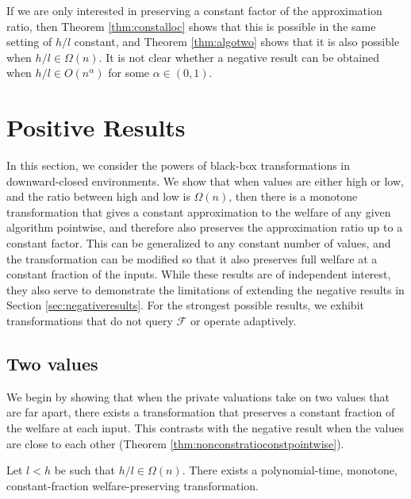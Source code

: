 \documentclass[runningheads,a4paper]{llncs}
\begin{document}
If we are only interested in preserving a constant factor of the approximation ratio, then Theorem \ref{thm:constalloc} shows that this is possible in the same setting of $h/l$ constant, and Theorem \ref{thm:algotwo} shows that it is also possible when $h/l\in\Omega(n)$. It is not clear whether a negative result can be obtained when $h/l\in O(n^\alpha)$ for some $\alpha\in(0,1)$.

\section{Positive Results}
\label{sec:positiveresults}

In this section, we consider the powers of black-box transformations in downward-closed environments. We show that when values are either high or low, and the ratio between high and low is $\Omega(n)$, then there is a monotone transformation that gives a constant approximation to the welfare of any given algorithm pointwise, and therefore also preserves the approximation ratio up to a constant factor. This can be generalized to any constant number of values, and the transformation can be modified so that it also preserves full welfare at a constant fraction of the inputs. While these results are of independent interest, they also serve to demonstrate the limitations of extending the negative results in Section \ref{sec:negativeresults}. For the strongest possible results, we exhibit transformations that do not query $\mathcal{F}$ or operate adaptively.

\subsection{Two values}

We begin by showing that when the private valuations take on two values that are far apart, there exists a transformation that preserves a constant fraction of the welfare at each input. This contrasts with the negative result when the values are close to each other (Theorem \ref{thm:nonconstratioconstpointwise}).

\begin{theorem}
\label{thm:algotwo}
Let $l<h$ be such that $h/l\in\Omega(n)$. There exists a polynomial-time, monotone, constant-fraction welfare-preserving transformation.
\end{theorem}
\end{document}
